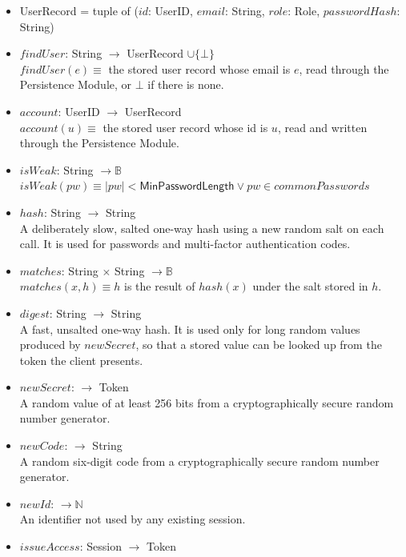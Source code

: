 \documentclass[12pt, titlepage]{article}
\begin{document}
\begin{itemize}
\item UserRecord = tuple of ($\mathit{id}$: UserID, $\mathit{email}$: String,
  $\mathit{role}$: Role, $\mathit{passwordHash}$: String)
\item $\mathit{findUser}$: String $\rightarrow$ UserRecord $\cup \{\bot\}$\\
  $\mathit{findUser}(e) \equiv$ the stored user record whose email is $e$,
  read through the Persistence Module, or $\bot$ if there is none.
\item $\mathit{account}$: UserID $\rightarrow$ UserRecord\\
  $\mathit{account}(u) \equiv$ the stored user record whose id is $u$, read
  and written through the Persistence Module.
\item $\mathit{isWeak}$: String $\rightarrow \mathbb{B}$\\
  $\mathit{isWeak}(\mathit{pw}) \equiv |\mathit{pw}| <
  \textsf{MinPasswordLength} \vee \mathit{pw} \in \mathit{commonPasswords}$
\item $\mathit{hash}$: String $\rightarrow$ String\\
  A deliberately slow, salted one-way hash using a new random salt on each
  call. It is used for passwords and multi-factor authentication codes.
\item $\mathit{matches}$: String $\times$ String $\rightarrow \mathbb{B}$\\
  $\mathit{matches}(x, h) \equiv h$ is the result of $\mathit{hash}(x)$ under
  the salt stored in $h$.
\item $\mathit{digest}$: String $\rightarrow$ String\\
  A fast, unsalted one-way hash. It is used only for long random values
  produced by $\mathit{newSecret}$, so that a stored value can be looked up
  from the token the client presents.
\item $\mathit{newSecret}$: $\rightarrow$ Token\\
  A random value of at least 256 bits from a cryptographically secure random
  number generator.
\item $\mathit{newCode}$: $\rightarrow$ String\\
  A random six-digit code from a cryptographically secure random number
  generator.
\item $\mathit{newId}$: $\rightarrow \mathbb{N}$\\
  An identifier not used by any existing session.
\item $\mathit{issueAccess}$: Session $\rightarrow$ Token\\

\end{itemize}
\end{document}
